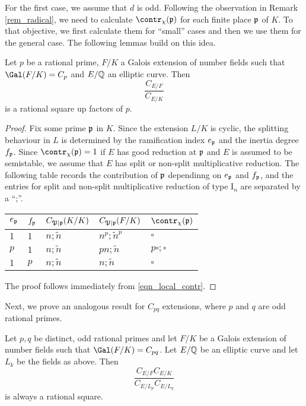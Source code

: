 For the first case, we assume that $d$ is odd. Following the observation in Remark \ref*{rem_radical}, we need to calculate $\contr_\chi(\pp)$ for each finite place $\mathfrak{p}$ of $K$. To that objective, we first calculate them for ``small'' cases and then we use them for the general case. The following lemmas build on this idea.

\begin{lemma}\label{lem_Cp}
    Let $p$ be a rational prime, $F/K$ a Galois extension of number fields such that $\Gal(F/K)=C_p$ and $E/\mathbb{Q}$ an elliptic curve. Then 
    $$\frac{C_{E/F}}{C_{E/K}}$$
    is a rational square up factors of $p$.
\end{lemma}

\begin{proof}
    Fix some prime $\mathfrak{p}$ in $K$. Since the extension $L/K$ is cyclic, the splitting behaviour in $L$ is determined by the ramification index $e_{\mathfrak{p}}$ and the inertia degree $f_{\mathfrak{p}}$. Since $\contr_\chi(\pp)=1$ if $E$ has good reduction at $\mathfrak{p}$ and $E$ is assumed to be semistable, we assume that $E$ has split or non-split multiplicative reduction. The following table records the contribution of $\mathfrak{p}$ dependinng on $e_{\mathfrak{p}}$ and $f_{\mathfrak{p}}$, and the entries for split and non-split multiplicative reduction of type $\mathrm{I}_n$ are separated by a ``;''.
    \begin{table}[h!]
        \centering
        \begin{tabular}{|l|l|l|l|l|}
        \hline
        $e_{\mathfrak{p}}$ & $f_{\mathfrak{p}}$  & $C_{\mathfrak{P}\mid \mathfrak{p}}(K/K)$ & $C_{\mathfrak{P}\mid \mathfrak{p}}(F/K)$  & $\contr_\chi(\pp)$ \\ \hline
        $1$ & $1$ & $n;\tilde{n}$ & $n^p;\tilde{n}^p$ & $\square$ \\ \hline
        $p$ & $1$ & $n;\tilde{n}$ & $pn;\tilde{n}$ & $p\square;\square$ \\ \hline
        $1$ & $p$ & $n;\tilde{n}$ & $n;\tilde{n}$ & $\square$ \\ \hline
        \end{tabular}
    \end{table}
    The proof follows immediately from \eqref{eqn_local_contr}.
\end{proof}

Next, we prove an analogous result for $C_{pq}$ extensions, where $p$ and $q$ are odd rational primes.

\begin{lemma}\label{lem_Cpq}
    Let $p,q$ be distinct, odd rational primes and let $F/K$ be a Galois extension of number fields such that $\Gal(F/K)=C_{pq}$. Let $E/\mathbb{Q}$ be an elliptic curve and let $L_k$ be the fields as above. Then
    $$\frac{C_{E/F}C_{E/K}}{C_{E/L_p}C_{E/L_q}}$$
    is always a rational square.
\end{lemma}

